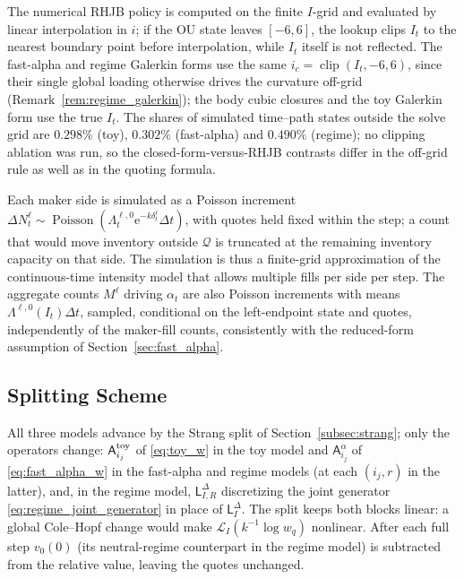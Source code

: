 \documentclass[11pt,a4paper]{article}
\newcommand{\Qcal}{\mathcal{Q}}
\newcommand{\Lcal}{\mathcal{L}}
\newcommand{\e}{\mathrm e}
\theoremstyle{plain}
\theoremstyle{definition}
\begin{document}
The numerical RHJB policy is computed on the finite \(I\)-grid and evaluated by
linear interpolation in \(i\); if the OU state leaves \([-6,6]\), the lookup
clips \(I_t\) to the nearest boundary point before interpolation, while
\(I_t\) itself is not reflected.  The fast-alpha and regime Galerkin forms
use the same \(i_c=\operatorname{clip}(I_t,-6,6)\), since their single global
loading otherwise drives the curvature off-grid
(Remark~\ref{rem:regime_galerkin}); the body cubic closures and the toy
Galerkin form use the true \(I_t\).  The shares of simulated time--path
states outside the solve grid are \(0.298\%\) (toy), \(0.302\%\)
(fast-alpha) and \(0.490\%\) (regime); no clipping ablation was run, so the
closed-form-versus-RHJB contrasts differ in the off-grid rule as well as in
the quoting formula.

Each maker side is simulated as a Poisson increment
\(\Delta N_t^\ell\sim\operatorname{Poisson}(\Lambda_t^{\ell,0}
\e^{-k\delta_t^\ell}\Delta t)\), with quotes held fixed within the step; a
count that would move inventory outside \(\Qcal\) is truncated at the remaining
inventory capacity on that side.  The simulation is thus a finite-grid
approximation of the continuous-time intensity model that allows multiple
fills per side per step.  The aggregate counts \(M^\ell\) driving \(\alpha_t\)
are also Poisson increments with means \(\Lambda^{\ell,0}(I_t)\Delta t\),
sampled, conditional on the left-endpoint state and quotes, independently of
the maker-fill counts, consistently with the reduced-form assumption of
Section~\ref{sec:fast_alpha}.

\subsection{Splitting Scheme}

All three models advance by the Strang split of Section~\ref{subsec:strang};
only the operators change: \(\mathsf A_{i_j}^{\rm toy}\) of \eqref{eq:toy_w}
in the toy model and \(\mathsf A_{i_j}^{\alpha}\) of \eqref{eq:fast_alpha_w}
in the fast-alpha and regime models (at each \((i_j,r)\) in the latter), and,
in the regime model, \(\mathsf L_{I,R}^\Delta\) discretizing the joint
generator \eqref{eq:regime_joint_generator} in place of
\(\mathsf L_I^\Delta\).  The split keeps both blocks linear: a global
Cole--Hopf change would make \(\Lcal_I(k^{-1}\log w_q)\) nonlinear.  After
each full step \(v_0(0)\) (its neutral-regime counterpart in the regime model)
is subtracted from the relative value, leaving the quotes unchanged.
\end{document}
